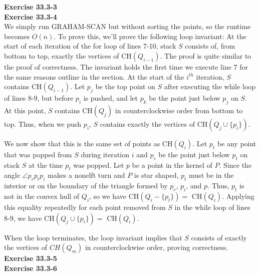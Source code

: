\documentclass{article}
\begin{document}
\noindent\textbf{Exercise 33.3-3}\\


\noindent\textbf{Exercise 33.3-4}\\

We simply run GRAHAM-SCAN but without sorting the points, so the runtime becomes $O(n)$.  To prove this, we'll prove the following loop invariant: At the start of each iteration of the for loop of lines 7-10, stack $S$ consists of, from bottom to top, exactly the vertices of CH$(Q_{i-1})$.  The proof is quite similar to the proof of correctness.  The invariant holds the first time we execute line 7 for the same reasons outline in the section.  At the start of the $i^{th}$ iteration, $S$ contains CH$(Q_{i-1})$.  Let $p_j$ be the top point on $S$ after executing the while loop of lines 8-9, but before $p_i$ is pushed, and let $p_k$ be the point just below $p_j$ on $S$.  At this point, $S$ contains CH$(Q_j)$ in counterclockwise order from bottom to top. Thus, when we push $p_i$, $S$ contains exactly the vertices of CH$(Q_j \cup \{p_i\})$.  

We now show that this is the same set of points as CH$(Q_i)$.  Let $p_t$ be any point that was popped from $S$ during iteration $i$ and $p_r$ be the point just below $p_t$ on stack $S$ at the time $p_t$ was popped.  Let $p$ be a point in the kernel of $P$. Since the angle $\angle p_rp_tp_i$ makes a nonelft turn and $P$ is star shaped, $p_t$ must be in the interior or on the boundary of the triangle formed by $p_r$, $p_i$, and $p$.  Thus, $p_t$ is not in the convex hull of $Q_i$, so we have CH$(Q_i - \{p_t\}) = $ CH$(Q_i)$.  Applying this equality repeatedly for each point removed from $S$ in the while loop of lines 8-9, we have CH$(Q_j \cup \{p_i\}) = $ CH$(Q_i)$.

When the loop terminates, the loop invariant implies that $S$ consists of exactly the vertices of $CH(Q_m)$ in counterclockwise order, proving correctness. \\

\noindent\textbf{Exercise 33.3-5}\\



\noindent\textbf{Exercise 33.3-6}\\
\end{document}
